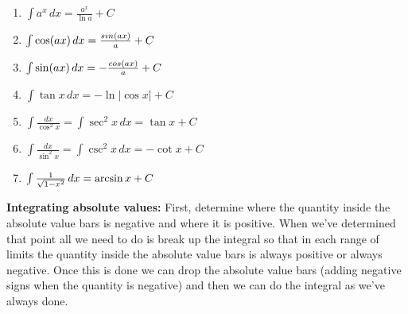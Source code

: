 \documentclass{article}
\begin{document}
\begin{multicols}{3}
\begin{center}
\begin{small}
\begin{enumerate}
            \item \begin{math}
                \int a^x\,dx = \frac{a^x}{\ln{a}} + C
            \end{math}
            \item \begin{math}
                \int \cos({ax}) \, dx = {sin (ax) \over a} + C
            \end{math}
            \item \begin{math}
                \int \sin({ax}) \, dx = {-{cos(ax) \over a}} + C
            \end{math}
            \item \begin{math}
                \int \tan{x} \, dx = -\ln{\left| \cos {x} \right|} + C
            \end{math}
            \item \begin{math}
                \int \frac{dx}{\cos^2 x}=\int \sec^2 x \, dx = \tan x + C
            \end{math}
            \item \begin{math}
                \int \frac{dx}{\sin^2 x}=\int \csc^2 x \, dx = -\cot x + C
            \end{math}
            \item \begin{math}
                \int {1 \over \sqrt{1-x^2}} \, dx = \arcsin {x} + C
            \end{math}
        \end{enumerate}
    \end{small}
\end{center}
\begin{tiny}
    \textbf{Integrating absolute values:}
    First, determine where the quantity inside the absolute value bars is negative and where it is positive.
    When we’ve determined that point all we need to do is break up the integral so that in each range of limits
    the quantity inside the absolute value bars is always positive or always negative. Once this is done we can
    drop the absolute value bars (adding negative signs when the quantity is negative) and then we can do the
    integral as we’ve always done.
\end{tiny}
\smallskip
\end{multicols}
\end{document}
